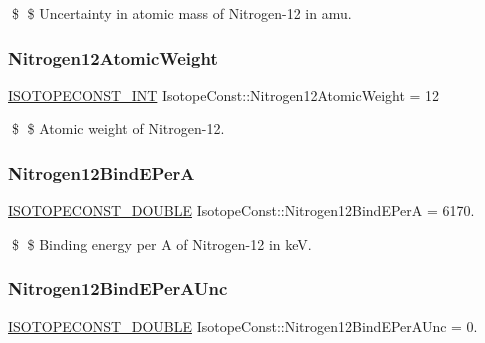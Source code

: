 \$ \$ Uncertainty in atomic mass of Nitrogen-\/12 in amu. \mbox{\label{group___isotope_const-_nitrogen-_n12_ga14b05af2e3de8e3cfcf6b4a8e09b02b7}} 
\subsubsection{\texorpdfstring{Nitrogen12\+Atomic\+Weight}{Nitrogen12AtomicWeight}}
{\footnotesize\ttfamily \mbox{\hyperlink{group___isotope_const-_macros_ga5f18360b3e99483a35c32d789e62621c}{I\+S\+O\+T\+O\+P\+E\+C\+O\+N\+S\+T\+\_\+\+I\+NT}} Isotope\+Const\+::\+Nitrogen12\+Atomic\+Weight = 12}

\$ \$ Atomic weight of Nitrogen-\/12. \mbox{\label{group___isotope_const-_nitrogen-_n12_ga4cdfbb8a7827f80b334cfa5227915bc8}} 
\subsubsection{\texorpdfstring{Nitrogen12\+Bind\+E\+PerA}{Nitrogen12BindEPerA}}
{\footnotesize\ttfamily \mbox{\hyperlink{group___isotope_const-_macros_ga8f45a7272ce02c0b4c65c44636ed719a}{I\+S\+O\+T\+O\+P\+E\+C\+O\+N\+S\+T\+\_\+\+D\+O\+U\+B\+LE}} Isotope\+Const\+::\+Nitrogen12\+Bind\+E\+PerA = 6170.}

\$ \$ Binding energy per A of Nitrogen-\/12 in keV. \mbox{\label{group___isotope_const-_nitrogen-_n12_gaec74b0aeae91b26ca89f8242b1e99277}} 
\subsubsection{\texorpdfstring{Nitrogen12\+Bind\+E\+Per\+A\+Unc}{Nitrogen12BindEPerAUnc}}
{\footnotesize\ttfamily \mbox{\hyperlink{group___isotope_const-_macros_ga8f45a7272ce02c0b4c65c44636ed719a}{I\+S\+O\+T\+O\+P\+E\+C\+O\+N\+S\+T\+\_\+\+D\+O\+U\+B\+LE}} Isotope\+Const\+::\+Nitrogen12\+Bind\+E\+Per\+A\+Unc = 0.}

